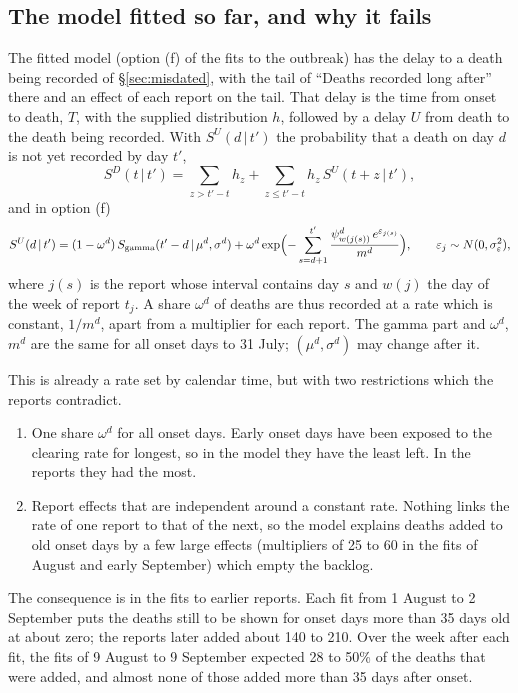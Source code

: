 \documentclass[11pt,a4paper]{article}
\newcommand{\given}{\,|\,}
\begin{document}
\subsection{The model fitted so far, and why it fails}

The fitted model (option (f) of the fits to the outbreak) has the delay to
a death being recorded of \S\ref{sec:misdated}, with the tail of ``Deaths
recorded long after'' there and an effect of each report on the tail. That
delay is the time from onset to death, $T$, with the supplied distribution
$h$, followed by a delay $U$ from death to the death being recorded. With $S^{U}(d\given t')$ the probability that a death on day
$d$ is not yet recorded by day $t'$,
\begin{equation}
S^{D}(t\given t')=\sum_{z>t'-t}h_z+\sum_{z\le t'-t}h_z\,S^{U}(t+z\given t'),
\label{eq:sdbacklog}
\end{equation}
and in option (f)
\[
S^{U}(d\given t')=(1-\omega^{d})\,S_{\mathrm{gamma}}(t'-d\given\mu^{d},\sigma^{d})
+\omega^{d}\exp\Bigl(-\sum_{s=d+1}^{t'}\frac{\psi^{d}_{w(j(s))}\,e^{\varepsilon_{j(s)}}}{m^{d}}\Bigr),
\qquad \varepsilon_j\sim N(0,\sigma_\varepsilon^{2}),
\]
where $j(s)$ is the report whose interval contains day $s$ and $w(j)$ the
day of the week of report $t_j$. A share
$\omega^{d}$ of deaths are thus recorded at a rate which is constant, $1/m^{d}$,
apart from a multiplier for each report. The gamma part and $\omega^{d}$,
$m^{d}$ are the same for all onset days to 31 July; $(\mu^{d},\sigma^{d})$ may
change after it.

This is already a rate set by calendar time, but with two restrictions which
the reports contradict.
\begin{enumerate}
\item One share $\omega^{d}$ for all onset days. Early onset days have been
exposed to the clearing rate for longest, so in the model they have the
least left. In the reports they had the most.
\item Report effects that are independent around a constant rate. Nothing
links the rate of one report to that of the next, so the model explains
deaths added to old onset days by a few large effects (multipliers of 25
to 60 in the fits of August and early September) which empty the backlog.
\end{enumerate}
The consequence is in the fits to earlier reports. Each fit from 1 August
to 2 September puts the deaths still to be shown for onset days more than
35 days old at about zero; the reports later added about 140 to 210. Over the
week after each fit, the fits of 9 August to 9 September expected 28 to
50\% of the deaths that were added, and almost none of those added more
than 35 days after onset.
\end{document}
